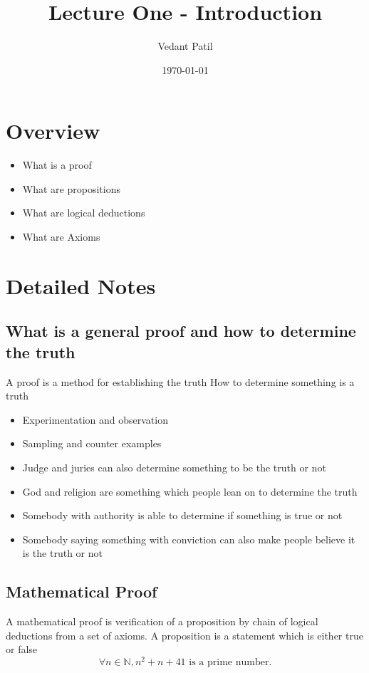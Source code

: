 \documentclass[12pt,a4paper]{article}
\title{Lecture One - Introduction}
\author{Vedant Patil}
\date{\today}
\begin{document}
\maketitle

\section{Overview}
\begin{tcolorbox}[colback=yellow!10!white,colframe=yellow!50!black,title=Key Points]
  \begin{itemize}
    \item What is a proof
    \item What are propositions 
    \item What are logical deductions 
    \item What are Axioms
  \end{itemize}
\end{tcolorbox}

\section{Detailed Notes}
\subsection{What is a general proof and how to determine the truth}
A proof is a method for establishing the truth
How to determine something is a truth 
\begin{itemize}
  \item Experimentation and observation
  \item Sampling and counter examples 
  \item Judge and juries can also determine something to be the truth or not 
  \item God and religion are something which people lean on to determine the truth 
  \item Somebody with authority is able to determine if something is true or not 
  \item Somebody saying something with conviction can also make people believe it is the truth or not 
\end{itemize}

\subsection{Mathematical Proof}
A mathematical proof is verification of a proposition by chain of logical deductions from a set of axioms. 
A proposition is a statement which is either true or false 
\begin{equation}
  \forall n \in \mathbb{N}, n^2+n+41 \text{ is a prime number.}
\end{equation}
\end{document}
